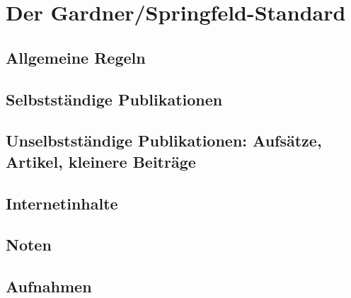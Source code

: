 \section{Der Gardner/Springfeld-Standard}
\subsection{Allgemeine Regeln}

\subsection{Selbstst\"andige Publikationen}
\subsection{Unselbstst\"andige Publikationen: Aufs\"atze, Artikel, kleinere Beitr\"age}
\subsection{Internetinhalte}
\subsection{Noten}
\subsection{Aufnahmen}
